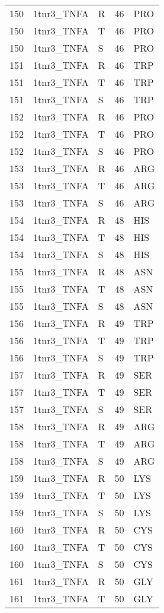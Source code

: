 \begin{longtable}[l]{l|l|l|l|l}
	150 & 1tnr3_TNFA & R & 46 & PRO \\
	150 & 1tnr3_TNFA & T & 46 & PRO \\
	150 & 1tnr3_TNFA & S & 46 & PRO \\
	151 & 1tnr3_TNFA & R & 46 & TRP \\
	151 & 1tnr3_TNFA & T & 46 & TRP \\
	151 & 1tnr3_TNFA & S & 46 & TRP \\
	152 & 1tnr3_TNFA & R & 46 & PRO \\
	152 & 1tnr3_TNFA & T & 46 & PRO \\
	152 & 1tnr3_TNFA & S & 46 & PRO \\
	153 & 1tnr3_TNFA & R & 46 & ARG \\
	153 & 1tnr3_TNFA & T & 46 & ARG \\
	153 & 1tnr3_TNFA & S & 46 & ARG \\
	154 & 1tnr3_TNFA & R & 48 & HIS \\
	154 & 1tnr3_TNFA & T & 48 & HIS \\
	154 & 1tnr3_TNFA & S & 48 & HIS \\
	155 & 1tnr3_TNFA & R & 48 & ASN \\
	155 & 1tnr3_TNFA & T & 48 & ASN \\
	155 & 1tnr3_TNFA & S & 48 & ASN \\
	156 & 1tnr3_TNFA & R & 49 & TRP \\
	156 & 1tnr3_TNFA & T & 49 & TRP \\
	156 & 1tnr3_TNFA & S & 49 & TRP \\
	157 & 1tnr3_TNFA & R & 49 & SER \\
	157 & 1tnr3_TNFA & T & 49 & SER \\
	157 & 1tnr3_TNFA & S & 49 & SER \\
	158 & 1tnr3_TNFA & R & 49 & ARG \\
	158 & 1tnr3_TNFA & T & 49 & ARG \\
	158 & 1tnr3_TNFA & S & 49 & ARG \\
	159 & 1tnr3_TNFA & R & 50 & LYS \\
	159 & 1tnr3_TNFA & T & 50 & LYS \\
	159 & 1tnr3_TNFA & S & 50 & LYS \\
	160 & 1tnr3_TNFA & R & 50 & CYS \\
	160 & 1tnr3_TNFA & T & 50 & CYS \\
	160 & 1tnr3_TNFA & S & 50 & CYS \\
	161 & 1tnr3_TNFA & R & 50 & GLY \\
	161 & 1tnr3_TNFA & T & 50 & GLY \\

\end{longtable}

